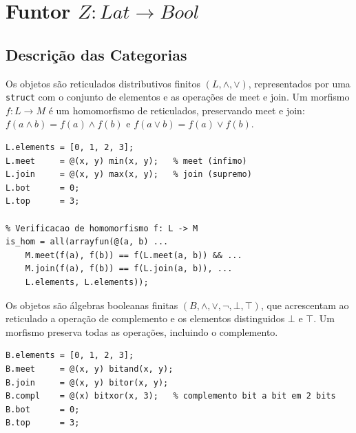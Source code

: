 \section{Funtor \texorpdfstring{$Z: Lat \to Bool$}{Z: DLat -> Bool}}
\label{sec:functor-dlat-bool}

\subsection{Descrição das Categorias}

\begin{definition}
Os objetos são reticulados distributivos finitos $(L, \wedge, \vee)$, representados por uma \texttt{struct} com o conjunto de elementos e as operações de meet e join. Um morfismo $f: L \to M$ é um homomorfismo de reticulados, preservando meet e join: $f(a \wedge b) = f(a) \wedge f(b)$ e $f(a \vee b) = f(a) \vee f(b)$.
\end{definition}

\begin{lstlisting}[style=matlab, caption={Objeto e morfismo em $\mathbf{DLat}$}]
% Reticulado distributivo: cadeia linear {0,1,2,3}
L.elements = [0, 1, 2, 3];
L.meet     = @(x, y) min(x, y);   % meet (infimo)
L.join     = @(x, y) max(x, y);   % join (supremo)
L.bot      = 0;
L.top      = 3;

% Verificacao de homomorfismo f: L -> M
is_hom = all(arrayfun(@(a, b) ...
    M.meet(f(a), f(b)) == f(L.meet(a, b)) && ...
    M.join(f(a), f(b)) == f(L.join(a, b)), ...
    L.elements, L.elements));
\end{lstlisting}

\begin{definition}
Os objetos são álgebras booleanas finitas $(B, \wedge, \vee, \neg, \bot, \top)$, que acrescentam ao reticulado a operação de complemento e os elementos distinguidos $\bot$ e $\top$. Um morfismo preserva todas as operações, incluindo o complemento.
\end{definition}

\begin{lstlisting}[style=matlab, caption={Objeto e morfismo em $\mathbf{Bool}$}]
% Algebra booleana: 2^2 = {00,01,10,11} representada por {0,1,2,3}
B.elements = [0, 1, 2, 3];
B.meet     = @(x, y) bitand(x, y);
B.join     = @(x, y) bitor(x, y);
B.compl    = @(x) bitxor(x, 3);   % complemento bit a bit em 2 bits
B.bot      = 0;
B.top      = 3;
\end{lstlisting}

